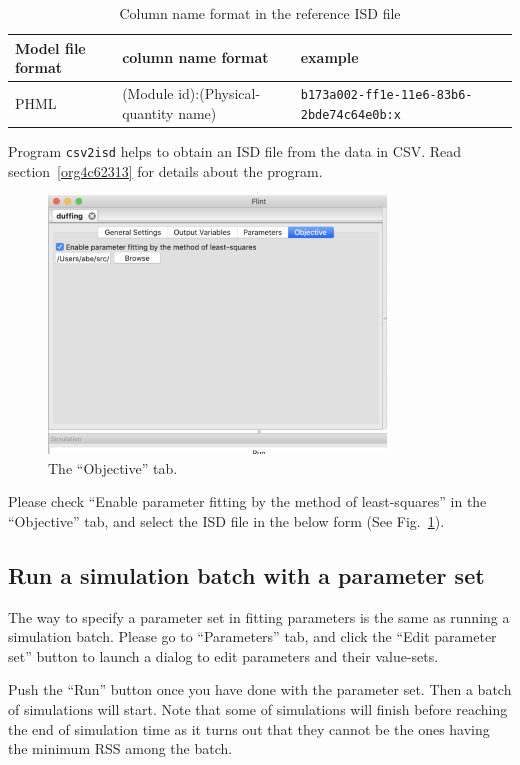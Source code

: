 \documentclass[a4paper,10pt]{report}
\begin{document}
\begin{table}[htbp]
\caption{\label{tab:orgd1cf01e}Column name format in the reference ISD file}
\centering
\begin{tabular}{lll}
Model file format & column name format & example\\
\hline
PHML & (Module id):(Physical-quantity name) & \texttt{b173a002-ff1e-11e6-83b6-2bde74c64e0b:x}\\
\end{tabular}
\end{table}

Program \texttt{csv2isd} helps to obtain an ISD file from the data in CSV.
Read section~\ref{org4c62313} for details about the program.

\begin{figure}[htbp]
\centering
\includegraphics[width=0.8\textwidth]{image/parameter-fitting-objective.png}
\caption{\label{fig:orge46129a}The ``Objective'' tab.}
\end{figure}

Please check ``Enable parameter fitting by the method of least-squares'' in the
``Objective'' tab, and select the ISD file in the below form (See
Fig.~\ref{fig:orge46129a}).

\subsection{Run a simulation batch with a parameter set}
\label{sec:org0590de5}
The way to specify a parameter set in fitting parameters is the same as running
a simulation batch. Please go to ``Parameters'' tab, and click the ``Edit parameter
set'' button to launch a dialog to edit parameters and their value-sets.

Push the ``Run'' button once you have done with the parameter set. Then a batch
of simulations will start. Note that some of simulations will finish before
reaching the end of simulation time as it turns out that they cannot be the ones
having the minimum RSS among the batch.
\end{document}
